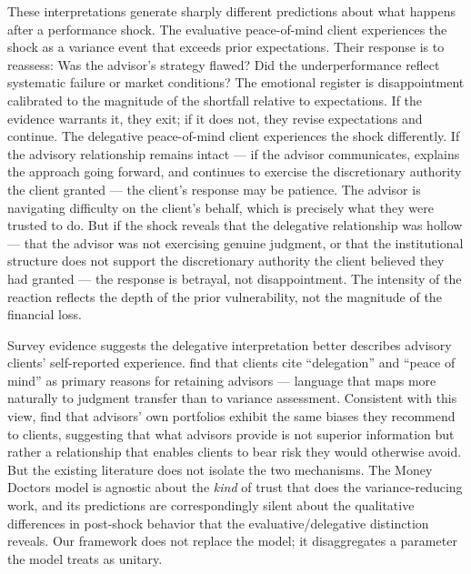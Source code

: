 These interpretations generate sharply different predictions about what happens after a performance shock. The evaluative peace-of-mind client experiences the shock as a variance event that exceeds prior expectations. Their response is to reassess: Was the advisor's strategy flawed? Did the underperformance reflect systematic failure or market conditions? The emotional register is disappointment calibrated to the magnitude of the shortfall relative to expectations. If the evidence warrants it, they exit; if it does not, they revise expectations and continue. The delegative peace-of-mind client experiences the shock differently. If the advisory relationship remains intact --- if the advisor communicates, explains the approach going forward, and continues to exercise the discretionary authority the client granted --- the client's response may be patience. The advisor is navigating difficulty on the client's behalf, which is precisely what they were trusted to do. But if the shock reveals that the delegative relationship was hollow --- that the advisor was not exercising genuine judgment, or that the institutional structure does not support the discretionary authority the client believed they had granted --- the response is betrayal, not disappointment. The intensity of the reaction reflects the depth of the prior vulnerability, not the magnitude of the financial loss.

Survey evidence suggests the delegative interpretation better describes advisory clients' self-reported experience. \citet{RossiUtkus2020} find that clients cite ``delegation'' and ``peace of mind'' as primary reasons for retaining advisors --- language that maps more naturally to judgment transfer than to variance assessment. Consistent with this view, \citet{FoersterEtAl2017} find that advisors' own portfolios exhibit the same biases they recommend to clients, suggesting that what advisors provide is not superior information but rather a relationship that enables clients to bear risk they would otherwise avoid. But the existing literature does not isolate the two mechanisms. The Money Doctors model is agnostic about the \textit{kind} of trust that does the variance-reducing work, and its predictions are correspondingly silent about the qualitative differences in post-shock behavior that the evaluative/\allowbreak delegative distinction reveals. Our framework does not replace the \citeauthor{GennaioliShleiferVishny2015} model; it disaggregates a parameter the model treats as unitary.



